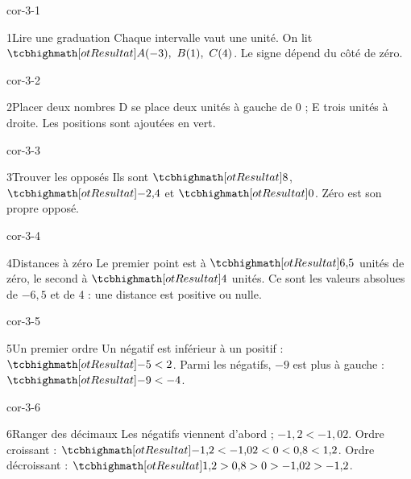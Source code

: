 \clearpage\pagestyle{otMain}\setlength{\otBlocEspacement}{2.5mm}\fontsize{11}{15}\selectfont{}
\begin{blocLivre}{cor-3-1}\begin{corrige}{1}{Lire une graduation}
Chaque intervalle vaut une unité. On lit $\res{A(-3),\ B(1),\ C(4)}$. Le signe dépend du côté de zéro.
\label{fig-cor-3-1}
\end{corrige}\end{blocLivre}
\begin{blocLivre}{cor-3-2}\begin{corrige}{2}{Placer deux nombres}
D se place deux unités à gauche de 0 ; E trois unités à droite. Les positions sont ajoutées en vert.
\label{fig-cor-3-2}
\end{corrige}\end{blocLivre}
\begin{blocLivre}{cor-3-3}\begin{corrige}{3}{Trouver les opposés}
Ils sont $\res8$, $\res{-2{,}4}$ et $\res0$. Zéro est son propre opposé.
\end{corrige}\end{blocLivre}
\begin{blocLivre}{cor-3-4}\begin{corrige}{4}{Distances à zéro}
Le premier point est à $\res{6{,}5}$ unités de zéro, le second à $\res4$ unités. Ce sont les valeurs absolues de $-6{,}5$ et de 4 : une distance est positive ou nulle.
\end{corrige}\end{blocLivre}
\begin{blocLivre}{cor-3-5}\begin{corrige}{5}{Un premier ordre}
Un négatif est inférieur à un positif : $\res{-5<2}$. Parmi les négatifs, $-9$ est plus à gauche : $\res{-9<-4}$.
\end{corrige}\end{blocLivre}
\begin{blocLivre}{cor-3-6}\begin{corrige}{6}{Ranger des décimaux}
Les négatifs viennent d’abord ; $-1{,}2<-1{,}02$. Ordre croissant : $\res{-1{,}2<-1{,}02<0<0{,}8<1{,}2}$. Ordre décroissant : $\res{1{,}2>0{,}8>0>-1{,}02>-1{,}2}$.
\end{corrige}\end{blocLivre}
